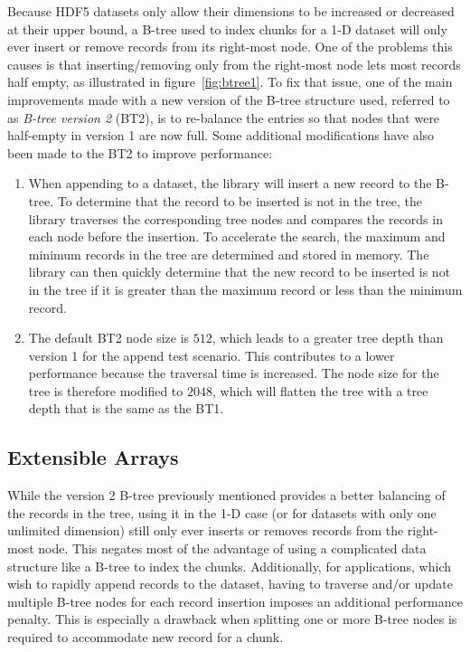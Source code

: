 Because HDF5 datasets only allow their dimensions to be increased or 
decreased at their upper bound, a B-tree used to index chunks for a 1-D 
dataset will only ever insert or remove records from its right-most node.
One of the problems this causes is that inserting/removing only from the right-most
node lets most records half empty, as illustrated in figure~\ref{fig:btree1}.
To fix that issue, one of the main improvements made with a new version of
the B-tree structure used, referred to as \textit{B-tree version 2} (BT2), is to
re-balance the entries so that nodes that were half-empty in version 1 are
now full.
Some additional modifications have also been made to the BT2 to improve performance:
\begin{enumerate}
\item
When appending to a dataset, the library will insert a new record to the
B-tree. To determine that the record to be inserted is not in the tree,
the library traverses the corresponding tree nodes and compares the records 
in each node before the insertion.
To accelerate the search, the maximum and minimum records in the tree are 
determined and stored in memory. The library can then quickly 
determine that the new record to be inserted is not in the tree if it is 
greater than the maximum record or less than the minimum record.
\item
The default BT2 node size is $512$, which leads to a greater tree depth
than version 1 for the append test scenario. This contributes to a lower
performance because the traversal time is increased. The node size for the
tree is therefore modified to $2048$, which will flatten the tree with a tree 
depth that is the same as the BT1.
\end{enumerate}

\subsection{Extensible Arrays}
While the version 2 B-tree previously mentioned provides a better
balancing of the records in the tree, using it in the 1-D case (or for
datasets with only one unlimited dimension) still only ever inserts or removes
records from the right-most node.
This negates most of the advantage of using a complicated data structure like a
B-tree to index the chunks.
Additionally, for applications, which wish to rapidly append records to the 
dataset, having to traverse and/or update multiple B-tree nodes for each 
record insertion imposes an additional performance penalty. This is 
especially a drawback when splitting one or more B-tree nodes is required to 
accommodate new record for a chunk.


